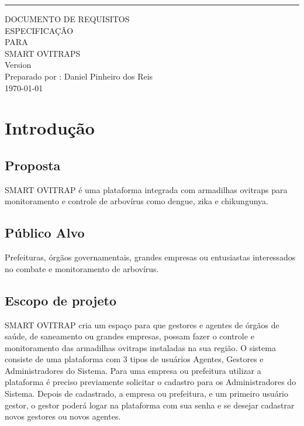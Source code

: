 	\begin{flushright}
		\rule{\textwidth}{5pt}\vskip1cm
		\begin{bfseries}
			\Huge{DOCUMENTO DE REQUISITOS\\ESPECIFICAÇÃO}\\
			\vspace{1.5cm}
			PARA\\
			\vspace{1.5cm}
			SMART OVITRAPS\\
			\vspace{1.5cm}
			\LARGE{Version \myversion}\\
			\vspace{1.5cm}
			Preparado por : Daniel Pinheiro dos Reis\\
			\vspace{1.5cm}
			\today\\
		\end{bfseries}
	\end{flushright}
		
	\chapter*{Introdução}
	
	\section*{Proposta}
	SMART OVITRAP é uma plataforma integrada com armadilhas ovitraps para monitoramento e controle de arbovírus como dengue, zika e chikungunya. 
	
	\section*{Público Alvo}
	Prefeituras, órgãos governamentais, grandes empresas ou entusiastas interessados no combate e monitoramento de arbovírus.
	\section*{Escopo de projeto}
	SMART OVITRAP cria um espaço para que gestores e agentes de órgãos de saúde, de saneamento ou grandes empresas, possam fazer o controle e 
	monitoramento das armadilhas ovitraps instaladas na sua região.
	\newline
	O sistema consiste de uma plataforma com 3 tipos de usuários Agentes, Gestores e Administradores do Sistema.
	Para uma empresa ou prefeitura utilizar a plataforma é preciso previamente solicitar o cadastro para os Administradores do Sistema. Depois de cadastrado,
	a empresa ou prefeitura, e um primeiro usuário gestor, o gestor poderá logar na plataforma com sua senha e se desejar cadastrar 
	novos gestores ou novos agentes. 
	
